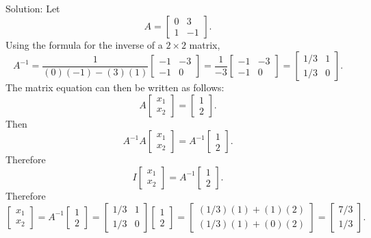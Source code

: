 \documentclass[12pt]{article}
\begin{document}
Solution: 
Let $$A = \left[ \begin{array}{cc}  0 & 3 \\ 1 & -1  \end{array} \right].$$
Using the formula for the inverse of a $2\times 2$ matrix,
$$ A^{-1} = \frac{1}{(0)(-1)-(3)(1)}
\left[ \begin{array}{cc}  -1 & -3 \\ -1 & 0  \end{array} \right]
= \frac{1}{-3}\left[ \begin{array}{cc}  -1 & -3 \\ -1 & 0   \end{array} \right]
= \left[ \begin{array}{cc}  1/3 & 1 \\ 1/3 & 0  \end{array} \right].$$
The matrix equation can then be written as follows:
$$A\left[ \begin{array}{c} x_1 \\ x_2 \end{array} \right] = \left[ \begin{array}{c} 1 \\ 2 \end{array} \right].$$
Then $$A^{-1}A\left[ \begin{array}{c} x_1 \\ x_2 \end{array} \right] = A^{-1}
\left[ \begin{array}{c} 1 \\ 2 \end{array} \right].$$
Therefore
$$I\left[ \begin{array}{c} x_1 \\ x_2 \end{array} \right] = A^{-1}\left[ \begin{array}{c} 1 \\ 2 \end{array} \right].$$
Therefore
$$\left[ \begin{array}{c} x_1 \\ x_2 \end{array} \right] = A^{-1}\left[ \begin{array}{c} 1 \\ 2 \end{array} \right]
= \left[ \begin{array}{cc}  1/3 & 1 \\ 1/3 & 0  \end{array} \right]\left[ \begin{array}{c} 1 \\ 2 \end{array} \right]
= \left[ \begin{array}{cc} (1/3)(1)+(1)(2) \\ (1/3)(1)+(0)(2)  \end{array} \right]
= \left[ \begin{array}{cc} 7/3 \\ 1/3  \end{array} \right].$$
\end{document}
